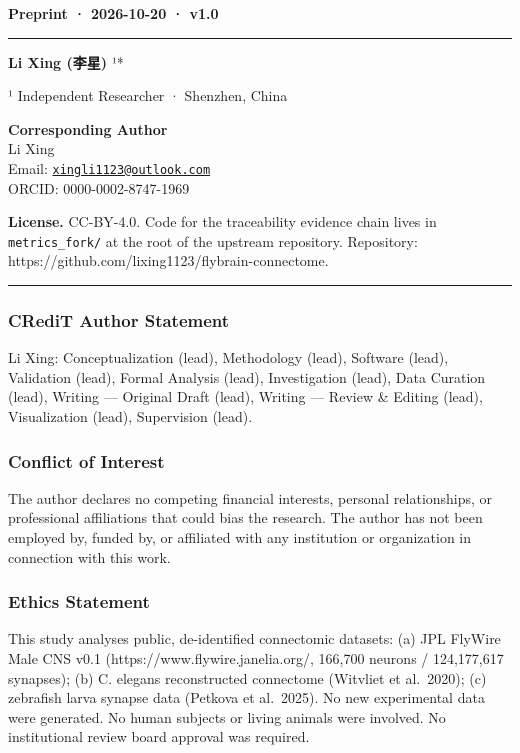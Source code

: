 \documentclass[
]{article}
\begin{document}
\textbf{Preprint · 2026-10-20 · v1.0}

\begin{center}\rule{0.5\linewidth}{0.5pt}\end{center}

\textbf{Li Xing (李星)} ¹*

¹ Independent Researcher · Shenzhen, China

\textbf{Corresponding Author}\\
Li Xing\\
Email:
\href{mailto:xingli1123@outlook.com}{\nolinkurl{xingli1123@outlook.com}}\\
ORCID: 0000-0002-8747-1969

\textbf{License.} CC-BY-4.0. Code for the traceability evidence chain
lives in \texttt{metrics\_fork/} at the root of the upstream repository.
Repository: https://github.com/lixing1123/flybrain-connectome.

\begin{center}\rule{0.5\linewidth}{0.5pt}\end{center}

\subsubsection{CRediT Author Statement}\label{credit-author-statement}

Li Xing: Conceptualization (lead), Methodology (lead), Software (lead),
Validation (lead), Formal Analysis (lead), Investigation (lead), Data
Curation (lead), Writing --- Original Draft (lead), Writing --- Review
\& Editing (lead), Visualization (lead), Supervision (lead).

\subsubsection{Conflict of Interest}\label{conflict-of-interest}

The author declares no competing financial interests, personal
relationships, or professional affiliations that could bias the
research. The author has not been employed by, funded by, or affiliated
with any institution or organization in connection with this work.

\subsubsection{Ethics Statement}\label{ethics-statement}

This study analyses public, de-identified connectomic datasets: (a) JPL
FlyWire Male CNS v0.1 (https://www.flywire.janelia.org/, 166,700 neurons
/ 124,177,617 synapses); (b) C. elegans reconstructed connectome
(Witvliet et al.~2020); (c) zebrafish larva synapse data (Petkova et
al.~2025). No new experimental data were generated. No human subjects or
living animals were involved. No institutional review board approval was
required.
\end{document}
